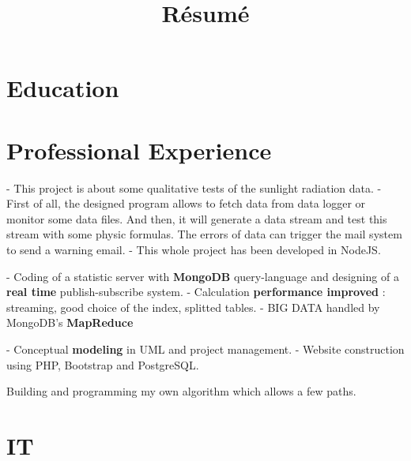 \documentclass[11pt,a4paper]{moderncv}
\title{Résumé}
\begin{document}
\maketitle

\section{Education}


\section{Professional Experience}

{
- This project is about some qualitative tests of the sunlight radiation data.\newline 
- First of all, the designed program allows to fetch data from data logger or monitor some data files. And then, it will generate a data stream and test this stream with some physic formulas. The errors of data can trigger the mail system to send a warning email.\newline
- This whole project has been developed in NodeJS.
}

{
- Coding of a statistic server with \textbf{MongoDB} query-language and designing of a \textbf{real time} publish-subscribe system.\newline
- Calculation \textbf{performance improved} : streaming, good choice of the index, splitted tables.\newline
- BIG DATA handled by MongoDB's \textbf{MapReduce}
}

{
- Conceptual \textbf{modeling} in UML and project management.\newline
- Website construction using PHP, Bootstrap and PostgreSQL.
}

{Building and programming my own algorithm which allows a few paths.}

\section{IT}
\end{document}

